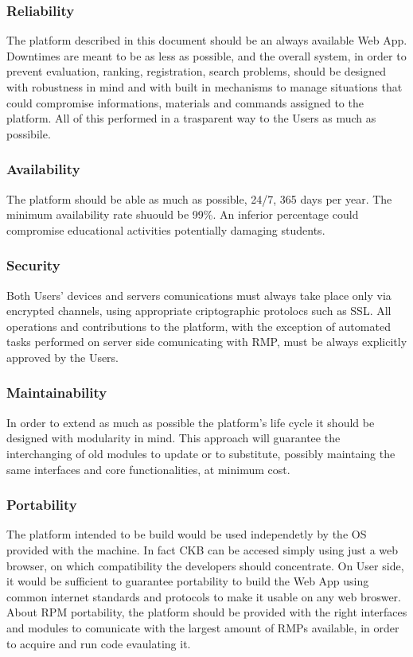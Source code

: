 \subsubsection{Reliability}
The platform described in this document should be an always available Web App. Downtimes are meant to be as less as possible, and the overall system, in order to prevent evaluation, ranking, registration, search problems, should be designed with robustness in mind and with built in mechanisms to manage situations that could compromise informations, materials and commands assigned to the platform. All of this performed in a trasparent way to the Users as much as possibile.
\subsubsection{Availability}
The platform should be able as much as possible, 24/7, 365 days per year. The minimum availability rate shuould be 99\%. An inferior percentage could compromise educational activities potentially damaging students.
\subsubsection{Security}
Both Users' devices and servers comunications must always take place only via encrypted channels, using appropriate criptographic protolocs such as SSL. All operations and contributions to the platform, with the exception of automated tasks performed on server side comunicating with RMP, must be always explicitly approved by the Users.
\subsubsection{Maintainability}
In order to extend as much as possible the platform's life cycle it should be designed with modularity in mind. This approach will guarantee the interchanging of old modules to update or to substitute, possibly maintaing the same interfaces and core functionalities, at minimum cost.
\subsubsection{Portability}
The platform intended to be build would be used independetly by the OS provided with the machine. In fact CKB can be accesed simply using just a web browser, on which compatibility the developers should concentrate. On User side, it would be sufficient to guarantee portability to build the Web App using common internet standards and protocols to make it usable on any web broswer. About RPM portability, the platform should be provided with the right interfaces and modules to comunicate with the largest amount of RMPs available, in order to acquire and run code evaulating it.





